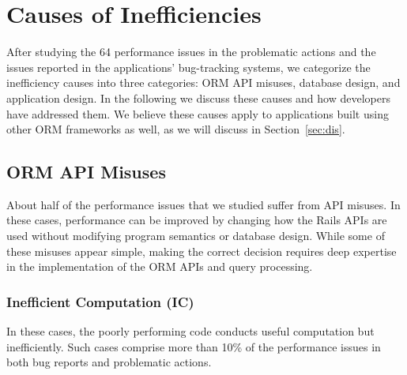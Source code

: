 \section{Causes of Inefficiencies}
\label{sec:causes}


After studying the 64 performance issues in the \numpactions problematic actions and the \numissues issues reported in the applications' bug-tracking systems, we categorize the inefficiency causes into three categories: ORM API misuses, database design, and application design. In the following we discuss these causes and how developers have addressed them. We believe these causes apply to applications built using other ORM frameworks as well, as we will discuss in Section~\ref{sec:dis}. 




\subsection{ORM API Misuses} 
\label{causes:api}

About half of the performance issues that we studied suffer from API misuses. In these cases, performance can be improved by changing how the Rails APIs are used without modifying program semantics or database design. While some of these misuses appear simple, making the correct decision requires deep expertise in the implementation of the ORM APIs and query processing.

\vspace{-0.1in}

\subsubsection{Inefficient Computation (IC)}
\label{sec:inefficomp}

In these cases, the poorly performing code conducts useful computation but inefficiently.
Such cases comprise more than 10\% of the performance issues in both bug reports and problematic actions. 
\vspace{-0.18in} 
